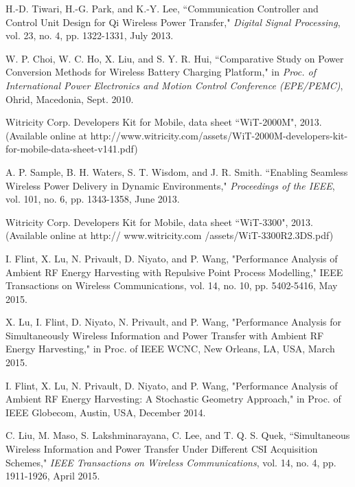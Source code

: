 \documentclass[twocolumn,10pt]{IEEEtran}
\begin{document}
\begin{thebibliography}{99}
H.-D. Tiwari, H.-G. Park, and K.-Y. Lee, ``Communication Controller and Control Unit Design for Qi Wireless Power Transfer," \emph{Digital Signal Processing}, vol. 23, no. 4, pp. 1322-1331, July 2013. 



W. P. Choi, W. C. Ho, X. Liu, and S. Y. R. Hui, ``Comparative Study on Power Conversion Methods for Wireless Battery Charging Platform," in \emph{Proc. of International Power Electronics and Motion Control Conference (EPE/PEMC)}, Ohrid, Macedonia, Sept. 2010. 
 

Witricity Corp. Developers Kit for Mobile, data sheet ``WiT-2000M", 2013. (Available online at http://www.witricity.com/assets/WiT-2000M-developers-kit-for-mobile-data-sheet-v141.pdf)



A. P. Sample, B. H. Waters, S. T. Wisdom, and J. R. Smith.
``Enabling Seamless Wireless Power Delivery in Dynamic
Environments," \emph{Proceedings of the IEEE},  vol. 101, no. 6, pp. 1343-1358, June 2013.

Witricity Corp. Developers Kit for Mobile, data sheet ``WiT-3300", 2013.
(Available online at http:// www.witricity.com /assets/WiT-3300R2.3DS.pdf) 




I. Flint, X. Lu, N. Privault, D. Niyato, and P. Wang, "Performance Analysis of Ambient RF Energy Harvesting with Repulsive Point Process Modelling," IEEE Transactions on Wireless Communications, vol. 14, no. 10, pp. 5402-5416, May 2015. 

X. Lu, I. Flint, D. Niyato, N. Privault, and P. Wang, "Performance Analysis for Simultaneously Wireless Information and Power Transfer with Ambient RF Energy Harvesting," in Proc. of IEEE WCNC, New Orleans, LA, USA, March 2015.

I. Flint, X. Lu, N. Privault, D. Niyato, and P. Wang, "Performance Analysis of Ambient RF Energy Harvesting: A Stochastic Geometry Approach," in Proc. of IEEE Globecom, Austin, USA, December 2014.

C. Liu, M.  Maso,  S. Lakshminarayana, C. Lee, and T. Q. S. Quek,  
``Simultaneous Wireless Information and Power Transfer Under Different CSI Acquisition Schemes," \emph{IEEE Transactions on 
Wireless Communications}, vol. 14, no. 4, pp. 1911-1926, April 2015. 


\end{thebibliography}
\end{document}
